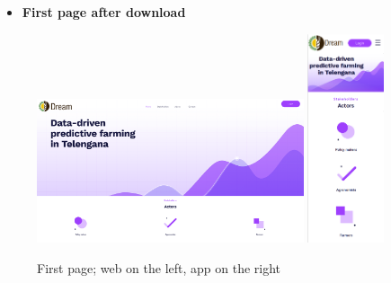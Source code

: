 \documentclass{article}
\begin{document}
    \newpage
    
    \begin{itemize}
        \item \textbf{First page after download}
    \end{itemize}
        \begin{figure} [h]
            \centering
            \includegraphics[width=0.7\textwidth]{images/UserInterfaces/FirstPageWeb.png}
            \quad
            \includegraphics[width=0.2\textwidth]{images/UserInterfaces/FirstPageApp.png}
            \quad
            \caption{\label{fig:firstPage}First page; web on the left, app on the right}
        \end{figure}
\end{document}
